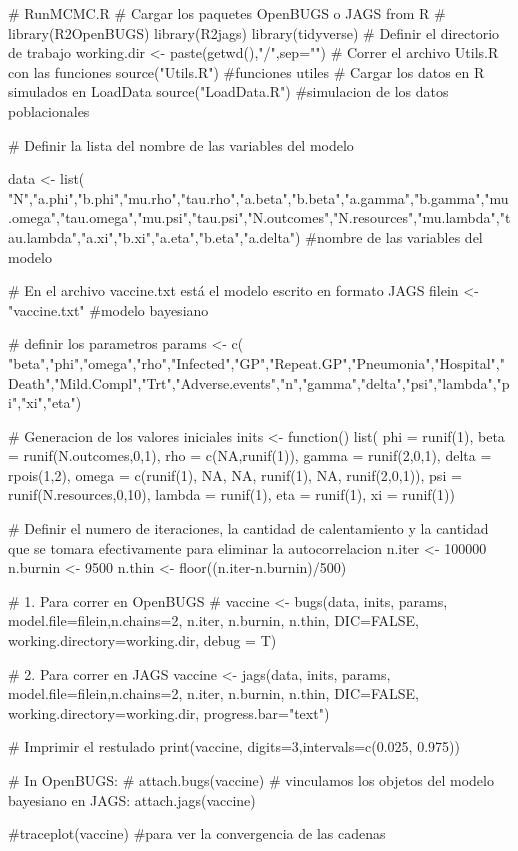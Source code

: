 \documentclass[12pt]{article}
\begin{document}
\begin{Rcode}
# RunMCMC.R
# Cargar los paquetes OpenBUGS o JAGS from R 
# library(R2OpenBUGS)
library(R2jags)
library(tidyverse)
# Definir el directorio de trabajo
working.dir <- paste(getwd(),"/",sep="")
# Correr el archivo Utils.R con las funciones 
source("Utils.R")   #funciones utiles
# Cargar los datos en R simulados en LoadData
source("LoadData.R")  #simulacion de los datos poblacionales

# Definir la lista del nombre de las variables del modelo

data <- list(
"N","a.phi","b.phi","mu.rho","tau.rho","a.beta","b.beta","a.gamma","b.gamma","mu.omega","tau.omega","mu.psi","tau.psi","N.outcomes","N.resources","mu.lambda","tau.lambda","a.xi","b.xi","a.eta","b.eta","a.delta")  #nombre de las variables del modelo

# En el archivo vaccine.txt está el modelo escrito en formato JAGS
filein <- "vaccine.txt"   #modelo bayesiano

# definir los parametros
params <- c( "beta","phi","omega","rho","Infected","GP","Repeat.GP","Pneumonia","Hospital","Death","Mild.Compl","Trt","Adverse.events","n","gamma","delta","psi","lambda","pi","xi","eta")


# Generacion de los valores iniciales
inits <- function(){
  list(
phi = runif(1), beta = runif(N.outcomes,0,1), rho = c(NA,runif(1)), gamma = runif(2,0,1), delta = rpois(1,2), omega = c(runif(1), NA, NA, runif(1), NA, runif(2,0,1)), psi = runif(N.resources,0,10), lambda = runif(1), eta = runif(1), xi = runif(1))
}

# Definir el numero de iteraciones, la cantidad de calentamiento y la cantidad que se tomara efectivamente para eliminar la autocorrelacion
n.iter <- 100000
n.burnin <- 9500
n.thin <- floor((n.iter-n.burnin)/500)

# 1. Para correr en OpenBUGS
# vaccine <- bugs(data, inits, params, model.file=filein,n.chains=2, n.iter, n.burnin, n.thin, DIC=FALSE, working.directory=working.dir, debug = T)

# 2. Para correr en JAGS
vaccine <- jags(data, inits, params, model.file=filein,n.chains=2, n.iter, n.burnin, n.thin,
                DIC=FALSE, working.directory=working.dir, progress.bar="text")

# Imprimir el restulado
print(vaccine, digits=3,intervals=c(0.025, 0.975))


# In OpenBUGS:
# attach.bugs(vaccine)
# vinculamos los objetos del modelo bayesiano en JAGS:
attach.jags(vaccine)

#traceplot(vaccine) #para ver la convergencia de las cadenas

\end{Rcode}
\end{document}
